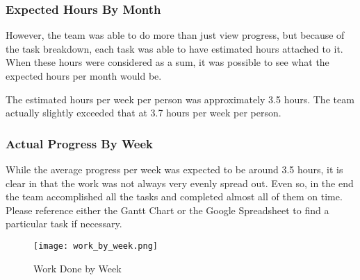 \documentclass[PPFS.tex]{template/subfiles}
\begin{document}
\subsubsection{Expected Hours By Month}
However, the team was able to do more than just view progress, but because of the task breakdown, each task was able to have estimated hours attached to it. When these hours were considered as a sum, it was possible to see what the expected hours per month would be.

The estimated hours per week per person was approximately 3.5 hours. The team actually slightly exceeded that at 3.7 hours per week per person.

\subsubsection{Actual Progress By Week}

While the average progress per week was expected to be around 3.5 hours, it is clear in  that the work was not always very evenly spread out. Even so, in the end the team accomplished all the tasks and completed almost all of them on time. Please reference either the Gantt Chart or the Google Spreadsheet to find a particular task if necessary.

\begin{figure}[H]
    \centering
    \texttt{[image: work\_by\_week.png]}
    \caption{Work Done by Week}
    \label{fig:work_by_week}
\end{figure}
\end{document}
